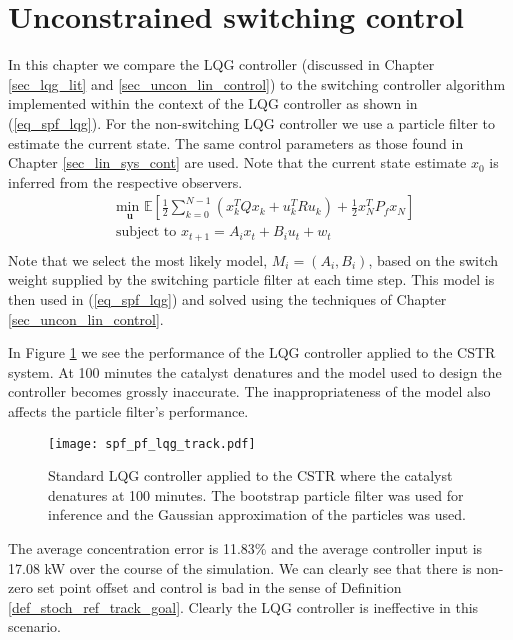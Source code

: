 \section{Unconstrained switching control}
\label{sec_spf_uncon}
In this chapter we compare the LQG controller (discussed in Chapter \ref{sec_lqg_lit} and \ref{sec_uncon_lin_control}) to the switching controller algorithm implemented within the context of the LQG controller as shown in (\ref{eq_spf_lqg}). For the non-switching LQG controller we use a particle filter to estimate the current state. The same control parameters as those found in Chapter \ref{sec_lin_sys_cont} are used. Note that the current state estimate $x_0$ is inferred from the respective observers.
\begin{equation}
\begin{aligned}
&\underset{\mathbf{u}}{\text{min }} \mathbb{E}\left[ \frac{1}{2}\sum_{k=0}^{N-1} \left( x_k^TQx_k + u_k^TRu_k \right) + \frac{1}{2}x_N^TP_fx_N \right] \\
& \text{subject to } x_{t+1}=A_ix_t+B_iu_t + w_t \\
\end{aligned}
\label{eq_spf_lqg}
\end{equation}
Note that we select the most likely model, $M_i=(A_i, B_i)$, based on the switch weight supplied by the switching particle filter at each time step. This model is then used in (\ref{eq_spf_lqg}) and solved using the techniques of Chapter \ref{sec_uncon_lin_control}.
 
In Figure \ref{fig_spf_pf_lqg_track} we see the performance of the LQG controller applied to the CSTR system. At 100 minutes the catalyst denatures and the model used to design the controller becomes grossly inaccurate. The inappropriateness of the model also affects the particle filter's performance. 
\begin{figure}[H] 
\centering
\texttt{[image: spf\_pf\_lqg\_track.pdf]}
\caption{Standard LQG controller applied to the CSTR where the catalyst denatures at 100 minutes. The bootstrap particle filter was used for inference and the Gaussian approximation of the particles was used.}
\label{fig_spf_pf_lqg_track}
\end{figure}
The average concentration error is 11.83\% and the average controller input is 17.08 kW over the course of the simulation. We can clearly see that there is non-zero set point offset and control is bad in the sense of Definition \ref{def_stoch_ref_track_goal}. Clearly the LQG controller is ineffective in this scenario.

